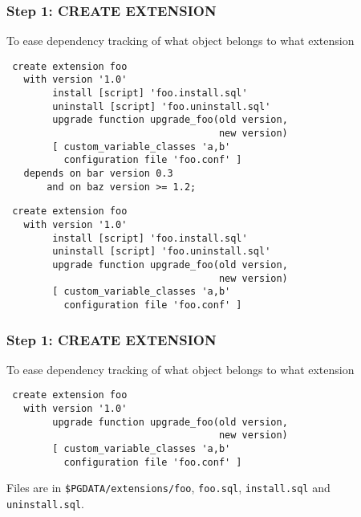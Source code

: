 \documentclass[english]{beamer}
\begin{document}
\begin{frame}[fragile]
  \frametitle{Step 1: CREATE EXTENSION}

  To ease dependency tracking of what object belongs to what extension

\begin{example}
  \begin{overprint}
\begin{verbatim}
 create extension foo 
   with version '1.0'
        install [script] 'foo.install.sql'
        uninstall [script] 'foo.uninstall.sql'
        upgrade function upgrade_foo(old version, 
                                     new version)
        [ custom_variable_classes 'a,b' 
          configuration file 'foo.conf' ]
   depends on bar version 0.3
       and on baz version >= 1.2;
\end{verbatim}

\begin{verbatim}
 create extension foo 
   with version '1.0'
        install [script] 'foo.install.sql'
        uninstall [script] 'foo.uninstall.sql'
        upgrade function upgrade_foo(old version, 
                                     new version)
        [ custom_variable_classes 'a,b' 
          configuration file 'foo.conf' ]
\end{verbatim}
  \end{overprint}
\end{example}
\end{frame}

\begin{frame}[fragile]
  \frametitle{Step 1: CREATE EXTENSION}

  To ease dependency tracking of what object belongs to what extension

\begin{example}
\begin{verbatim}
 create extension foo 
   with version '1.0'
        upgrade function upgrade_foo(old version, 
                                     new version)
        [ custom_variable_classes 'a,b' 
          configuration file 'foo.conf' ]
\end{verbatim}
\end{example}

  Files are in \texttt{\$PGDATA/extensions/foo}, \texttt{foo.sql},
  \texttt{install.sql} and \texttt{uninstall.sql}.

\end{frame}
\end{document}
